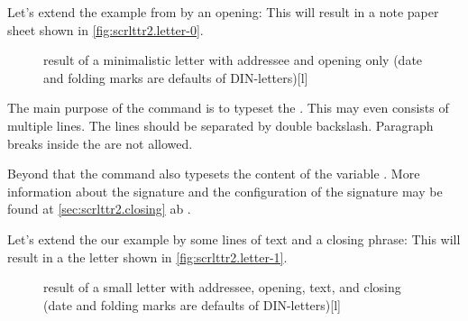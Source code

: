 \begin{Example}
  Let's extend the example from
   by an opening:
  This will result in a note paper sheet shown in
  \autoref{fig:scrlttr2.letter-0}.
  \begin{figure}
    \setcapindent{0pt}%
    \begin{captionbeside}{%
        result of a minimalistic letter with addressee and opening only 
        (date and folding marks are defaults of DIN-letters)}[l]
    \end{captionbeside}
    \label{fig:scrlttr2.letter-0}
  \end{figure}
\end{Example}
\iffalse%

In the early days of computer-generated letters, programs did not have many
capabilities, therefore the letters seldom had an opening.  Today the
capabilities have been enhanced. Thus personal openings are very common, even
in mass-production advertising letters.%
\fi
%
\EndIndexGroup

\begin{Declaration}
\end{Declaration}
The main purpose of the command  is to typeset the
. This may even consists of multiple
lines. The lines should be separated by double backslash. Paragraph breaks
inside the  are not allowed.

Beyond that the command also typesets the content of the variable
. More information about the signature and the
configuration of the signature may be found at \autoref{sec:scrlttr2.closing}
ab .

\begin{Example}
  Let's extend the our example by some lines of text and a closing phrase:
  This will result in a the letter shown in \autoref{fig:scrlttr2.letter-1}.
  \begin{figure}
    \setcapindent{0pt}%
    \begin{captionbeside}{%
        result of a small letter with addressee, opening, text, and closing
        (date and folding marks are defaults of DIN-letters)}[l]
    \end{captionbeside}
    \label{fig:scrlttr2.letter-1}
  \end{figure}
\end{Example}
%
\EndIndexGroup

